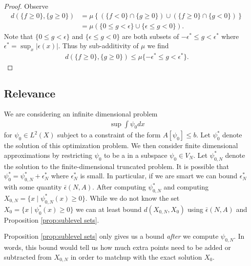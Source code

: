 \documentclass[12pt]{amsart}
\begin{document}
\begin{proof}
  Observe
  \begin{align*}
  	d( \{ f\geq 0 \} , \{ g \geq 0 \} ) &= \mu \left\{  \left( \{ f < 0 \} \cap \{ g \geq 0 \} \right) \cup \left( \{ f \geq 0 \} \cap \{ g < 0 \} \right) \right\} \\
		&= \mu \left( \{ 0 \leq g < \epsilon \} \cup \{ \epsilon \leq g < 0 \} \right).
  \end{align*}
  Note that $\{ 0 \leq g < \epsilon \}$ and $\{ \epsilon \leq g < 0\}$ are both subsets of $-\epsilon^{*} \leq g < \epsilon^{*}$
  where $\epsilon^{*} = \sup_{x} | \epsilon(x) |$.  Thus by sub-additivity of $\mu$ we find
  \begin{align*}
  	d( \{ f \geq 0 \} , \{ g \geq 0 \} ) \leq \mu \{ -\epsilon^{*} \leq g < \epsilon^{*} \}.
  \end{align*}
  \end{proof}

\subsection{Relevance}
We are considering an infinite dimensional problem
\begin{align*}
	\sup \int \psi_{0} dx
\end{align*}
for $\psi_{0} \in L^{2}(X)$ subject to a constraint of the form $A[\psi_{0}] \leq b$.
Let $\psi_{0}^{*}$ denote the solution of this optimization problem.
We then consider finite dimensional approximations by restricting $\psi_{0}$ to be a in a subspace $\psi_{0} \in V_{N}$.
Let $\psi^{*}_{0,N}$ denote the solution to the finite-dimensional truncated problem.
It is possible that $\psi_{0}^{*} = \psi^{*}_{0,N} + \epsilon^{*}_{N}$ where $\epsilon_{N}^{*}$ is small.
In particular, if we are smart we can bound $\epsilon_{N}^{*}$ with some quantity $\bar{\epsilon}(N , A)$.
After computing $\psi_{0,N}^{*}$ and computing $X_{0,N} = \{ x \mid \psi_{0,N}^{*}(x) \geq 0 \}$.
While we do not know the set $X_{0} = \{ x \mid \psi_{0}^{*}(x) \geq 0 \}$ we can at least bound $d( X_{0,N} , X_{0})$
using $\bar{\epsilon}(N,A)$ and Proposition \ref{prop:sublevel sets}.

Proposition \ref{prop:sublevel sets} only gives us a bound \emph{after} we compute $\psi_{0,N}$.
In words, this bound would tell us how much extra points need to be added or subtracted from $X_{0,N}$ in order to matchup 
with the exact solution $X_{0}$.



\end{document}
